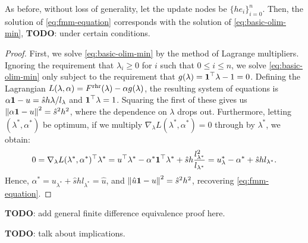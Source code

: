 \documentclass[eikonal.tex]{subfiles}
\begin{document}
\begin{theorem}
  As before, without loss of generality, let the update nodes be
  $\{h e_i\}_{i=0}^n$. Then, the solution of \cref{eq:fmm-equation}
  corresponds with the solution of \cref{eq:basic-olim-min},
  \textbf{TODO}: under certain conditions.
\end{theorem}

\begin{proof}
  First, we solve \cref{eq:basic-olim-min} by the method of Lagrange
  multipliers. Ignoring the requirement that $\lambda_i \geq 0$ for
  $i$ such that $0 \leq i \leq n$, we solve \cref{eq:basic-olim-min}
  only subject to the requirement that
  $g(\lambda) = \boldsymbol{1}^\top \lambda - 1 = 0$. Defining the Lagrangian
  $L(\lambda, \alpha) = F^{\operatorname{rhr}}(\lambda) - \alpha g(\lambda)$, the
  resulting system of equations is
  $\alpha \boldsymbol{1} - u = \hat{s} h \lambda / l_\lambda$ and
  $\boldsymbol{1}^\top \lambda = 1$. Squaring the first of these gives us
  $\left\|\alpha \boldsymbol{1} - u\right\|^2 = \hat{s}^2 h^2$, where the dependence on
  $\lambda$ drops out. Furthermore, letting $(\lambda^*, \alpha^*)$ be
  optimum, if we multiply $\nabla_\lambda L(\lambda^*, \alpha^*) = 0$ through by
  $\lambda^*$, we obtain:
  \begin{equation*}
    0 = \nabla_\lambda L(\lambda^*, \alpha^*)^\top \lambda^* = u^\top \lambda^* - \alpha^* \boldsymbol{1}^\top \lambda^* + \hat{s} h \frac{l_{\lambda^*}^2}{l_{\lambda^*}} = u_\lambda^* - \alpha^* + \hat{s} h l_{\lambda^*}.
  \end{equation*}
  Hence, $\alpha^* = u_{\lambda^*} + \hat{s} h l_{\lambda^*} = \hat{u}$, and
  $\left\|\hat{u} \boldsymbol{1} - u\right\|^2 = \hat{s}^2 h^2$, recovering
  \cref{eq:fmm-equation}.
\end{proof}

\textbf{TODO}: add general finite difference equivalence proof here.

\textbf{TODO}: talk about implications.


\end{document}

